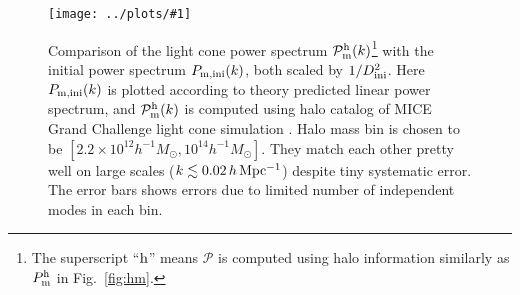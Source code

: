 \documentclass[prd,amsmath,amssymb,floatfix,superscriptaddress,nofootinbib,twocolumn]{revtex4-1}
\newcommand{\ini}{\rm ini}
\newcommand{\rf}[1]{\ref{fig:#1}}
\newcommand{\sfig}[2]{
\texttt{[image: ../plots/\#1]}
        }
\newcommand{\Sfig}[2]{
   \begin{figure}[thbp]
   \begin{center}
    \sfig{../plots/#1.pdf}{\columnwidth}
    \caption{{\small #2}}
    \label{fig:#1}
     \end{center}
   \end{figure}
}
\begin{document}
\Sfig{psLC}{Comparison of the light cone power spectrum $\mathcal{P}_{\rm m}^{\rm h}(k)$\footnote{The superscript ``$\rm h$'' means $\mathcal{P}$ is computed using halo information similarly as $P_{\rm m}^{\rm h}$ in Fig.~\rf{hm}.} with the initial power spectrum $P_{\rm m,ini}(k)$, both scaled by $1/D_{\ini}^{2}$. Here $P_{\rm m,ini}(k)$ is plotted according to theory predicted linear power spectrum, and $\mathcal{P}_{\rm m}^{\rm h}(k)$ is computed using halo catalog of MICE Grand Challenge light cone simulation \cite{Fosalba:2015MI}\cite{Fosalba:2015MII}. Halo mass bin is chosen to be $[2.2 \times 10^{12}h^{-1}M_{\odot},10^{14}h^{-1}M_{\odot}]$. They match each other pretty well on large scales ($k\lesssim 0.02 \,h\,\rm Mpc^{-1}$) despite tiny systematic error. The error bars shows errors due to limited number of independent modes in each bin.}
\end{document}

